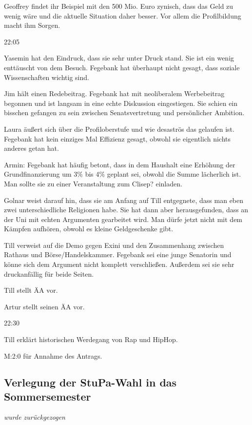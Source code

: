 \documentclass[ngerman,headheight=70pt]{scrartcl}
\begin{document}
    Geoffrey findet ihr Beispiel mit den 500 Mio. Euro zynisch, dass das Geld
    zu wenig wäre und die aktuelle Situation daher besser. Vor allem die Profilbildung
    macht ihm Sorgen.

    22:05

    Yasemin hat den Eindruck, dass sie sehr unter Druck stand. Sie ist ein
    wenig enttäuscht von dem Besuch. Fegebank hat überhaupt nicht
    gesagt, dass soziale Wissenschaften wichtig sind.

    Jim hält einen Redebeitrag. Fegebank hat mit neoliberalem Werbebeitrag
    begonnen und ist langsam in eine echte Diskussion eingestiegen.
    Sie schien ein bisschen gefangen zu sein zwischen Senatsvertretung und
    persönlicher Ambition.

    Laura äußert sich über die Profiloberstufe und wie desaströs das gelaufen
    ist. Fegebank hat kein einziges Mal Effizienz gesagt, obwohl sie eigentlich
    nichts anderes getan hat.

    Armin: Fegebank hat häufig betont, dass in dem Haushalt eine Erhöhung
    der Grundfinanzierung um 3\% bis 4\% geplant sei, obwohl die Summe lächerlich
    ist. Man sollte sie zu einer Veranstaltung zum Clisep? einladen.

    Golnar weist darauf hin, dass sie am Anfang auf Till entgegnete, dass
    man eben zwei unterschiedliche Religionen habe. Sie hat dann aber herausgefunden,
    dass an der Uni mit echten Argumenten gearbeitet wird.
    Man dürfe jetzt nicht mit dem Kämpfen aufhören, obwohl es kleine Geldgeschenke
    gibt.

    Till verweist auf die Demo gegen Exini und den Zusammenhang zwischen
    Rathaus und Börse/Handelskammer. Fegebank sei eine junge Senatorin und könne
    sich dem Argument nicht komplett verschließen. Außerdem sei sie sehr
    druckanfällig für beide Seiten.

    Till stellt ÄA vor.

    Artur stellt seinen ÄA vor.

    22:30

    Till erklärt historischen Werdegang von Rap und HipHop.

    M:2:0 für Annahme des Antrags.

    \subsection{Verlegung der StuPa-Wahl in das Sommersemester}

    \textit{wurde zurückgezogen}
\end{document}
